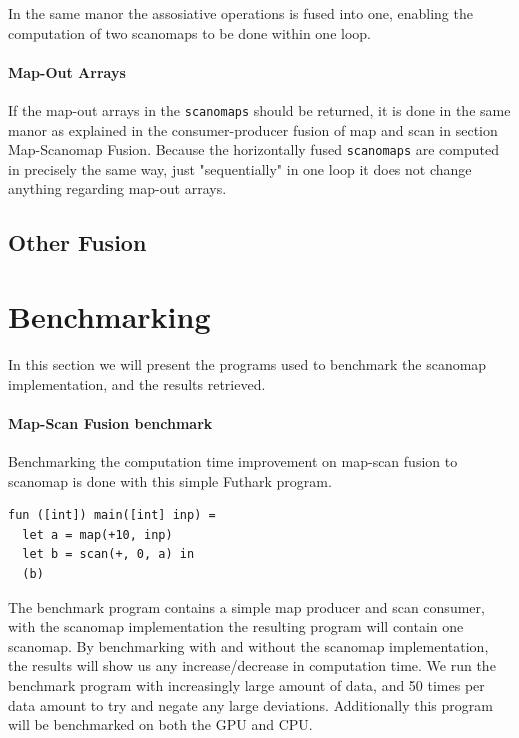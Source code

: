 \documentclass[11pt]{article}
\begin{document}
In the same manor the assosiative operations is fused into one, enabling the computation of two scanomaps to be done within one loop. 

\paragraph{Map-Out Arrays}
If the map-out arrays in the \texttt{scanomaps} should be returned, it is done in the same manor as explained in the consumer-producer fusion of map and scan in section Map-Scanomap Fusion. Because the horizontally fused \texttt{scanomaps} are computed in precisely the same way, just "sequentially" in one loop it does not change anything regarding map-out arrays.

\subsection{Other Fusion}




\newpage
\section{Benchmarking}

In this section we will present the programs used to benchmark the scanomap implementation, and the results retrieved.

\paragraph*{Map-Scan Fusion benchmark}
Benchmarking the computation time improvement on map-scan fusion to scanomap is done with this simple Futhark program. 

\begin{lstlisting}[caption=Test program] 
fun ([int]) main([int] inp) =
  let a = map(+10, inp)
  let b = scan(+, 0, a) in
  (b)
\end{lstlisting}

The benchmark program contains a simple map producer and scan consumer, with the scanomap implementation the resulting program will contain one scanomap. By benchmarking with and without the scanomap implementation, the results will show us any increase/decrease in computation time. We run the benchmark program with increasingly large amount of data, and 50 times per data amount to try and negate any large deviations. Additionally this program will be benchmarked on both the GPU and CPU. \\
\end{document}
